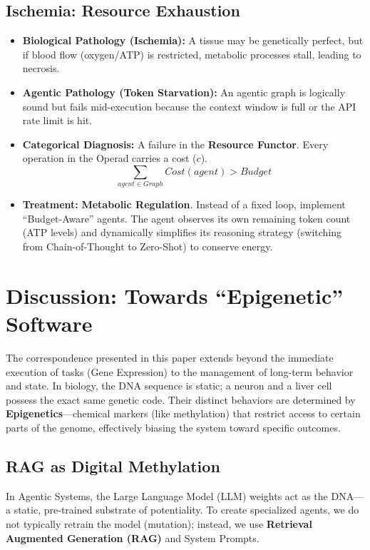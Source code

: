 \documentclass[11pt, a4paper]{article}
\begin{document}
\subsection{Ischemia: Resource Exhaustion}
\begin{itemize}
    \item \textbf{Biological Pathology (Ischemia):} A tissue may be genetically perfect, but if blood flow (oxygen/ATP) is restricted, metabolic processes stall, leading to necrosis.
    \item \textbf{Agentic Pathology (Token Starvation):} An agentic graph is logically sound but fails mid-execution because the context window is full or the API rate limit is hit.
    \item \textbf{Categorical Diagnosis:} A failure in the \textbf{Resource Functor}. Every operation in the Operad carries a cost ($c$).
    \begin{equation}
        \sum_{agent \in Graph} Cost(agent) > Budget
    \end{equation}
    \item \textbf{Treatment:} \textbf{Metabolic Regulation}. Instead of a fixed loop, implement ``Budget-Aware'' agents. The agent observes its own remaining token count (ATP levels) and dynamically simplifies its reasoning strategy (switching from Chain-of-Thought to Zero-Shot) to conserve energy.
\end{itemize}

\section{Discussion: Towards ``Epigenetic'' Software}

The correspondence presented in this paper extends beyond the immediate execution of tasks (Gene Expression) to the management of long-term behavior and state. In biology, the DNA sequence is static; a neuron and a liver cell possess the exact same genetic code. Their distinct behaviors are determined by \textbf{Epigenetics}---chemical markers (like methylation) that restrict access to certain parts of the genome, effectively biasing the system toward specific outcomes.

\subsection{RAG as Digital Methylation}
In Agentic Systems, the Large Language Model (LLM) weights act as the DNA---a static, pre-trained substrate of potentiality. To create specialized agents, we do not typically retrain the model (mutation); instead, we use \textbf{Retrieval Augmented Generation (RAG)} and System Prompts.
\end{document}
